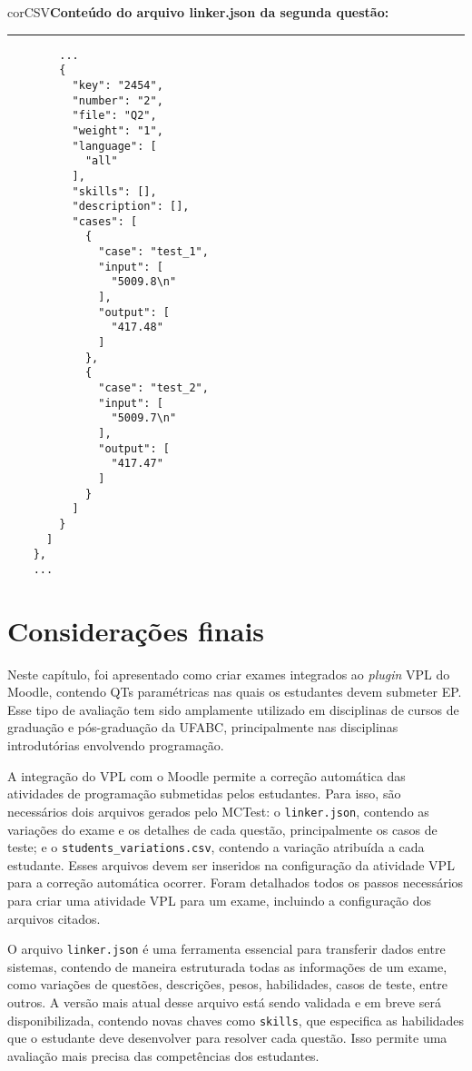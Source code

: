 \begin{myboxCode}{corCSV}{\textbf{Conteúdo do arquivo linker.json da segunda questão:}}\vspace{3mm}
\hrule
{\scriptsize 
\begin{verbatim}
        ...
        {
          "key": "2454",
          "number": "2",
          "file": "Q2",
          "weight": "1",
          "language": [
            "all"
          ],
          "skills": [],
          "description": [],
          "cases": [
            {
              "case": "test_1",
              "input": [
                "5009.8\n"
              ],
              "output": [
                "417.48"
              ]
            },
            {
              "case": "test_2",
              "input": [
                "5009.7\n"
              ],
              "output": [
                "417.47"
              ]
            }
          ]
        }
      ]
    },
    ...
\end{verbatim}
}
\end{myboxCode}

\section{Considerações finais}

Neste capítulo, foi apresentado como criar exames integrados ao \textit{plugin} VPL do Moodle, contendo QTs paramétricas nas quais os estudantes devem submeter EP. Esse tipo de avaliação tem sido amplamente utilizado em disciplinas de cursos de graduação e pós-graduação da UFABC, principalmente nas disciplinas introdutórias envolvendo programação.

A integração do VPL com o Moodle permite a correção automática das atividades de programação submetidas pelos estudantes. Para isso, são necessários dois arquivos gerados pelo MCTest: o \verb|linker.json|, contendo as variações do exame e os detalhes de cada questão, principalmente os casos de teste; e o \verb|students_variations.csv|, contendo a variação atribuída a cada estudante. Esses arquivos devem ser inseridos na configuração da atividade VPL para a correção automática ocorrer. Foram detalhados todos os passos necessários para criar uma atividade VPL para um exame, incluindo a configuração dos arquivos citados.

O arquivo \verb|linker.json| é uma ferramenta essencial para transferir dados entre sistemas, contendo de maneira estruturada todas as informações de um exame, como variações de questões, descrições, pesos, habilidades, casos de teste, entre outros. A versão mais atual desse arquivo está sendo validada e em breve será disponibilizada, contendo novas chaves como \verb|skills|, que especifica as habilidades que o estudante deve desenvolver para resolver cada questão. Isso permite uma avaliação mais precisa das competências dos estudantes.

